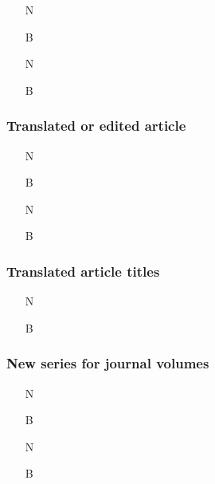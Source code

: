 \documentclass[11pt,letterpaper,oneside]{article}
\begin{document}
\begin{itemize}
\item[N] 

\item[B] 

\item[N] 

\item[B] 
\end{itemize}

\subsubsection{Translated or edited article}
\label{14.192}

\begin{itemize}
\item[N] 

\item[B] 

\item[N] 

\item[B] 
\end{itemize}

\setcounter{subsubsection}{193}
\subsubsection{Translated article titles}

\begin{itemize}
\item[N] 

\item[B] 
\end{itemize}

\setcounter{subsubsection}{194}
\subsubsection{New series for journal volumes}
\label{14.195}

\begin{itemize}
\item[N] 

\item[B] 

\item[N] 

\item[B] 
\end{itemize}
\end{document}

